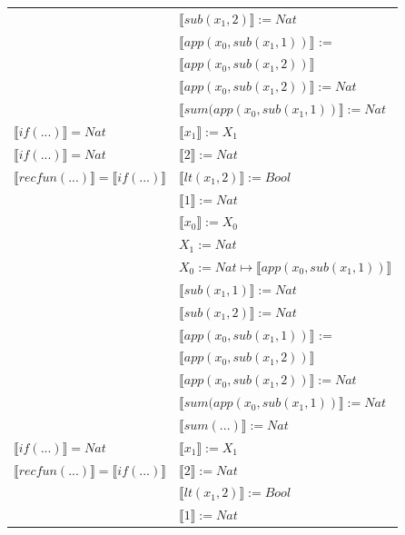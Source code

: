 \begin{exercise}
\begin{description}
\begin{center}
\begin{longtable}[!h]{ | l | l | }
			     & $ \llbracket sub(x_1,2) \rrbracket := Nat$ \\
			     & $ \llbracket app(x_0, sub(x_1,1)) \rrbracket$ := \\
			     & $ \llbracket app(x_0, sub(x_1,2)) \rrbracket$\\ 
			     & $ \llbracket app(x_0, sub(x_1,2)) \rrbracket := Nat$ \\
			     & $ \llbracket sum(app(x_0, sub(x_1,1)) \rrbracket := Nat$ \\
                    \hline 
                        $ \llbracket if(...) \rrbracket = Nat$ & $ \llbracket x_1 \rrbracket := X_1$\\
                        $ \llbracket if(...) \rrbracket = Nat$ & $ \llbracket 2 \rrbracket := Nat$\\
                        $ \llbracket recfun(...) \rrbracket =  \llbracket if(...) \rrbracket$ & $ \llbracket lt(x_1 , 2) \rrbracket := Bool$\\
                        & $ \llbracket 1 \rrbracket := Nat$\\ 
                        & $ \llbracket x_0 \rrbracket := X_0$\\  
			     & $X_1 := Nat$\\
			     & $X_0 := Nat \mapsto  \llbracket app(x_0, sub(x_1,1)) \rrbracket$\\
			     & $ \llbracket sub(x_1,1) \rrbracket := Nat$\\
			     & $ \llbracket sub(x_1,2) \rrbracket := Nat$ \\
			     & $ \llbracket app(x_0, sub(x_1,1)) \rrbracket$ := \\
			     & $ \llbracket app(x_0, sub(x_1,2)) \rrbracket$\\ 
			     & $ \llbracket app(x_0, sub(x_1,2)) \rrbracket := Nat$ \\
			     & $ \llbracket sum(app(x_0, sub(x_1,1)) \rrbracket := Nat$ \\
			     & $ \llbracket sum(...) \rrbracket := Nat$ \\
                     \hline 
                        $ \llbracket if(...) \rrbracket = Nat$ & $ \llbracket x_1 \rrbracket := X_1$\\
                        $ \llbracket recfun(...) \rrbracket =  \llbracket if(...) \rrbracket$ & $ \llbracket 2 \rrbracket := Nat$\\ 
                        & $ \llbracket lt(x_1 , 2) \rrbracket := Bool$\\ 
                        & $ \llbracket 1 \rrbracket := Nat$\\  

\end{longtable}
\end{center}
\end{description}
\end{exercise}
